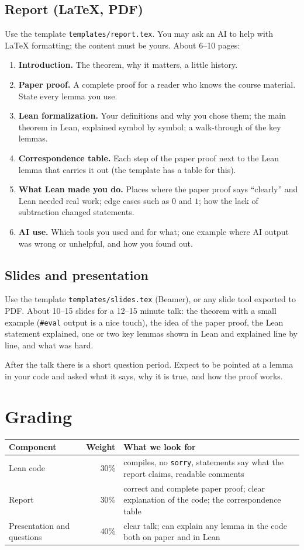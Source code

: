\documentclass[11pt]{article}
\newcommand{\lean}[1]{\texttt{#1}}
\begin{document}
\subsection{Report (LaTeX, PDF)}
Use the template \lean{templates/report.tex}. You may ask an AI to help with LaTeX formatting;
the content must be yours. About 6--10 pages:
\begin{enumerate}
\item \textbf{Introduction.} The theorem, why it matters, a little history.
\item \textbf{Paper proof.} A complete proof for a reader who knows the course material. State
  every lemma you use.
\item \textbf{Lean formalization.} Your definitions and why you chose them; the main theorem in
  Lean, explained symbol by symbol; a walk-through of the key lemmas.
\item \textbf{Correspondence table.} Each step of the paper proof next to the Lean lemma that
  carries it out (the template has a table for this).
\item \textbf{What Lean made you do.} Places where the paper proof says ``clearly'' and Lean
  needed real work; edge cases such as $0$ and $1$; how the lack of subtraction changed
  statements.
\item \textbf{AI use.} Which tools you used and for what; one example where AI output was wrong
  or unhelpful, and how you found out.
\end{enumerate}

\subsection{Slides and presentation}
Use the template \lean{templates/slides.tex} (Beamer), or any slide tool exported to PDF. About
10--15 slides for a 12--15 minute talk: the theorem with a small example (\lean{\#eval} output is
a nice touch), the idea of the paper proof, the Lean statement explained, one or two key lemmas
shown in Lean and explained line by line, and what was hard.

After the talk there is a short question period. Expect to be pointed at a lemma in your code
and asked what it says, why it is true, and how the proof works.

\section{Grading}

\begin{tabularx}{\textwidth}{@{}lrX@{}}
\toprule
Component & Weight & What we look for \\
\midrule
Lean code & 30\% & compiles, no \lean{sorry}, statements say what the report claims, readable
  comments \\
Report & 30\% & correct and complete paper proof; clear explanation of the code; the
  correspondence table \\
Presentation and questions & 40\% & clear talk; can explain any lemma in the code both on paper
  and in Lean \\
\bottomrule
\end{tabularx}
\end{document}
